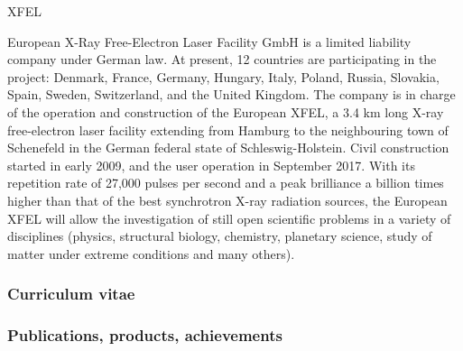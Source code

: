 \begin{sitedescription}{XFEL}
  \label{sitedescription:euxfel}



  European X-Ray Free-Electron Laser Facility GmbH is a limited
  liability company under German law. At present, 12 countries are
  participating in the project: Denmark, France, Germany, Hungary,
  Italy, Poland, Russia, Slovakia, Spain, Sweden, Switzerland, and the
  United Kingdom.  The company is in charge of the operation and
  construction of the European XFEL, a 3.4 km long X-ray free-electron
  laser facility extending from Hamburg to the neighbouring town of
  Schenefeld in the German federal state of Schleswig-Holstein. Civil
  construction started in early 2009, and the user operation in
  September 2017. With its repetition rate of 27,000 pulses per second
  and a peak brilliance a billion times higher than that of the best
  synchrotron X-ray radiation sources, the European XFEL will allow
  the investigation of still open scientific problems in a variety of
  disciplines (physics, structural biology, chemistry, planetary
  science, study of matter under extreme conditions and many others).


\subsubsection*{Curriculum vitae}

%




%
\subsubsection*{Publications, products, achievements}


\end{sitedescription}
